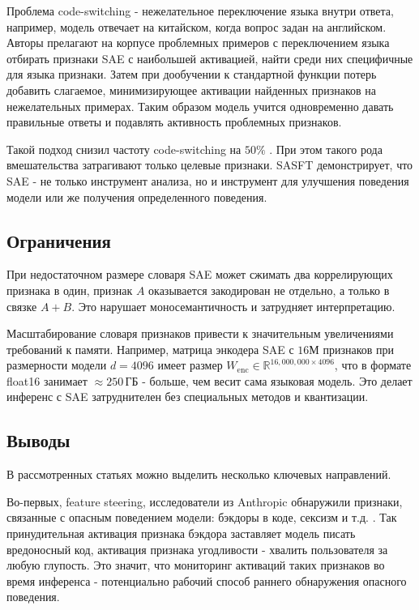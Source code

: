 \documentclass[a4paper,14pt]{extreport}
\begin{document}
Проблема code-switching - нежелательное переключение языка внутри ответа,
например, модель отвечает на китайском, когда вопрос задан на английском.
Авторы прелагают на корпусе проблемных примеров с переключением языка 
отбирать признаки SAE с наибольшей активацией, найти среди них специфичные 
для языка признаки. Затем при дообучении к стандартной функции потерь 
добавить слагаемое, минимизирующее активации найденных признаков на нежелательных примерах.
Таким образом модель учится одновременно давать правильные ответы и подавлять активность проблемных признаков.

Такой подход снизил частоту code-switching на $50\%$ \cite{qwen_scope_2026}.
При этом такого рода вмешательства затрагивают только целевые признаки. 
SASFT демонстрирует, что SAE - не только инструмент анализа, но и
инструмент для улучшения поведения модели или же получения определенного поведения.

\subsection{Ограничения}

При недостаточном размере словаря SAE может сжимать два коррелирующих признака
в один, признак $A$ оказывается закодирован не отдельно, а только в связке $A+B$.
Это нарушает моносемантичность и затрудняет интерпретацию.

Масштабирование словаря признаков привести к значительным увеличениями требований к памяти.
Например, матрица энкодера SAE с $16$М признаков при размерности модели $d = 4096$
имеет размер $W_{\mathrm{enc}} \in \mathbb{R}^{16{,}000{,}000 \times 4096}$,
что в формате float16 занимает $\approx 250$\,ГБ - больше, чем весит
сама языковая модель. Это делает инференс с SAE затруднителен без специальных методов и квантизации.

\subsection{Выводы}

В рассмотренных статьях можно выделить несколько ключевых направлений.

Во-первых, feature steering, \cite{templeton2024scaling}
исследователи из Anthropic обнаружили признаки, связанные с опасным поведением модели: бэкдоры в коде,
сексизм и т.д. .
Так принудительная активация признака бэкдора заставляет модель
писать вредоносный код, активация признака угодливости - хвалить пользователя
за любую глупость. Это значит, что мониторинг активаций таких признаков во время
инференса - потенциально рабочий способ раннего обнаружения опасного поведения.
\end{document}
